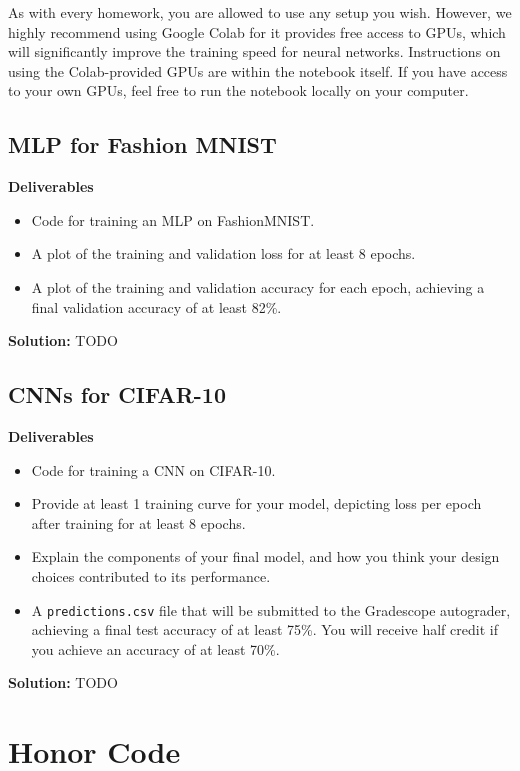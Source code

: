 \documentclass{article}
\newcommand{\Question}[1]{\Large \section{ #1 } \normalsize}
\newenvironment{solution}{\color{blue} \smallskip \textbf{Solution:}}{}
\begin{document}
As with every homework, you are allowed to use any setup you wish. 
However, we highly recommend using Google Colab for it provides free access to GPUs, which will significantly improve the training speed for neural networks. 
Instructions on using the Colab-provided GPUs are within the notebook itself. 
If you have access to your own GPUs, feel free to run the notebook locally on your computer.

\subsection{MLP for Fashion MNIST}
\textbf{Deliverables}
\begin{itemize}
    \item 
    Code for training an MLP on FashionMNIST.
    \item 
    A plot of the training and validation loss for at least 8 epochs.
    \item 
    A plot of the training and validation accuracy for each epoch, achieving a final validation accuracy of at least 82\%.
\end{itemize}

\begin{solution}
    TODO
\end{solution}

\newpage
\subsection{CNNs for CIFAR-10}
\textbf{Deliverables}
\begin{itemize}
    \item 
    Code for training a CNN on CIFAR-10.
    \item 
    Provide at least 1 training curve for your model, depicting loss per epoch after training for at least 8 epochs.
    \item 
    Explain the components of your final model, and how you think your design choices contributed to its performance.
    \item 
    A \texttt{predictions.csv} file that will be submitted to the Gradescope autograder, achieving a final test accuracy of at least 75\%. 
    You will receive half credit if you achieve an accuracy of at least 70\%.
\end{itemize}

\begin{solution}
    TODO
\end{solution}

\newpage
\Question{Honor Code}
\end{document}
